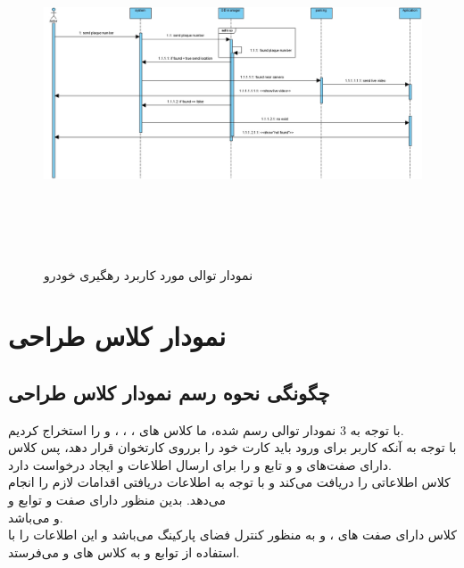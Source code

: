 \documentclass[oneside,a4paper,12pt]{book}
\begin{document}
\begin{figure}
	\begin{center}
		\includegraphics[height=10cm, width=15cm]{UC4.jpg}
		\caption{نمودار توالی مورد کاربرد رهگیری خودرو}
	\end{center}
\end{figure}

\chapter{نمودار کلاس طراحی}
\section{چگونگی نحوه رسم نمودار کلاس طراحی}
با توجه به 3 نمودار توالی رسم شده، ما کلاس های ، ، ،  و  را استخراج کردیم.\\

با توجه به آنکه کاربر برای ورود باید کارت خود را برروی کارتخوان قرار دهد، پس کلاس  دارای صفت‌های  و  و تابع  و  را برای ارسال اطلاعات و ایجاد درخواست دارد.\\

کلاس  اطلاعاتی را دریافت می‌کند و با توجه به اطلاعات دریافتی اقدامات لازم را انجام می‌دهد. بدین منظور دارای صفت  و توابع  و\\  و  می‌باشد.\\

کلاس  دارای صفت های ،  و  به منظور کنترل فضای پارکینگ می‌باشد و این اطلاعات را با استفاده از توابع  و  به کلاس های  و  می‌فرستد.\\
\end{document}
